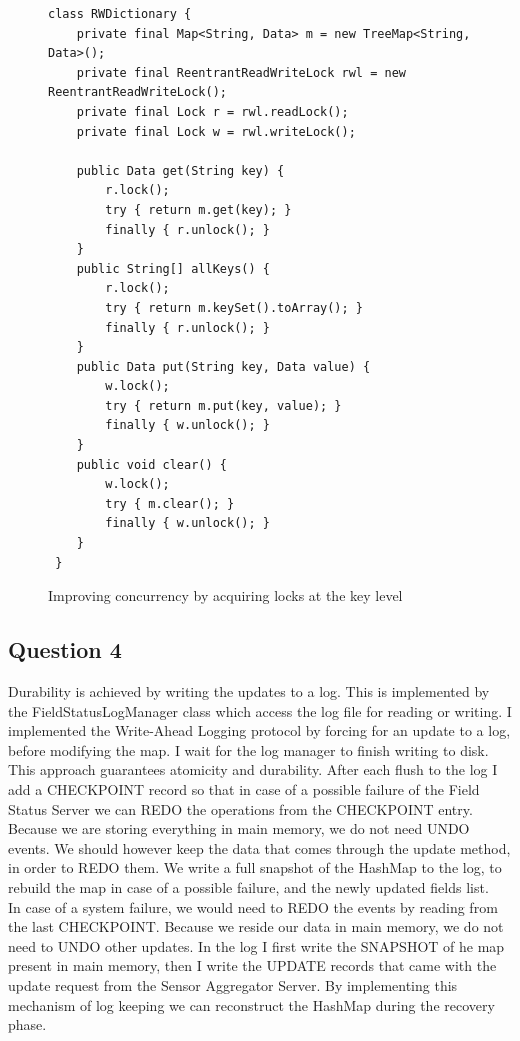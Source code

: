 \documentclass{article}      %
\begin{document}
\begin{figure}[htbp]
\begin{center}
\begin{lstlisting}
class RWDictionary {
    private final Map<String, Data> m = new TreeMap<String, Data>();
    private final ReentrantReadWriteLock rwl = new ReentrantReadWriteLock();
    private final Lock r = rwl.readLock();
    private final Lock w = rwl.writeLock();

    public Data get(String key) {
        r.lock();
        try { return m.get(key); }
        finally { r.unlock(); }
    }
    public String[] allKeys() {
        r.lock();
        try { return m.keySet().toArray(); }
        finally { r.unlock(); }
    }
    public Data put(String key, Data value) {
        w.lock();
        try { return m.put(key, value); }
        finally { w.unlock(); }
    }
    public void clear() {
        w.lock();
        try { m.clear(); }
        finally { w.unlock(); }
    }
 }
\end{lstlisting}
\caption{Improving concurrency by acquiring locks at the key level}
\label{Improving concurrency by acquiring locks at the key level}
\end{center}
\end{figure}



\subsection* {Question 4}

Durability is achieved by writing the updates to a log. This is implemented by the FieldStatusLogManager class which access the log file for reading or writing. I implemented the Write-Ahead Logging protocol by forcing for an update to a log, before modifying the map. I wait for the log manager to finish writing to disk. This approach guarantees atomicity and durability. After each flush to the log I add a CHECKPOINT record so that in case of a possible failure of the Field Status Server we can REDO the operations from the CHECKPOINT entry. Because we are storing everything in main memory, we do not need UNDO events. We should however keep the data that comes through the update method, in order to REDO them. We write a full snapshot of the HashMap to the log, to rebuild the map in case of a possible failure, and the newly updated fields list.\\

In case of a system failure, we would need to REDO the events by reading from the last CHECKPOINT. Because we reside our data in main memory, we do not need to UNDO other updates. In the log I first write the SNAPSHOT of he map present in main memory, then I write the UPDATE records that came with the update request from the Sensor Aggregator Server. By implementing this mechanism of log keeping we can reconstruct the HashMap during the recovery phase. \\
\end{document}
